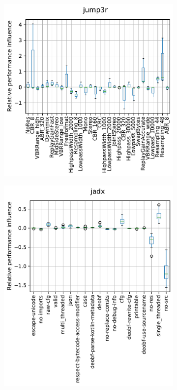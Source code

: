 \begin{figure}
	\begin{minipage}{0.33\textwidth}
		\begin{subfigure}{\linewidth}
			\includegraphics[width=\linewidth]{images/rq2/relative_performance_jump3r.pdf}
			\vspace{6mm}
		\end{subfigure}
	\end{minipage}
	\begin{minipage}{0.33\textwidth}
		\begin{subfigure}{\linewidth}
			\includegraphics[width=\linewidth]{images/rq2/relative_performance_jadx.pdf}

\end{subfigure}
\end{minipage}
\end{figure}
